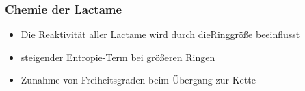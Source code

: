 \documentclass[10pt]{beamer}
\begin{document}
\begin{frame}[t]\frametitle{Chemie der Lactame}

 \begin{itemize}
   \item \scriptsize Die Reaktivität aller Lactame wird durch dieRinggröße beeinflusst
     \end{itemize}
\begin{center}
\end{center}
\begin{itemize}
   \item \scriptsize steigender Entropie-Term bei größeren Ringen
   \item \scriptsize Zunahme von Freiheitsgraden beim Übergang zur Kette
\end{itemize}
\end{frame}
\end{document}

